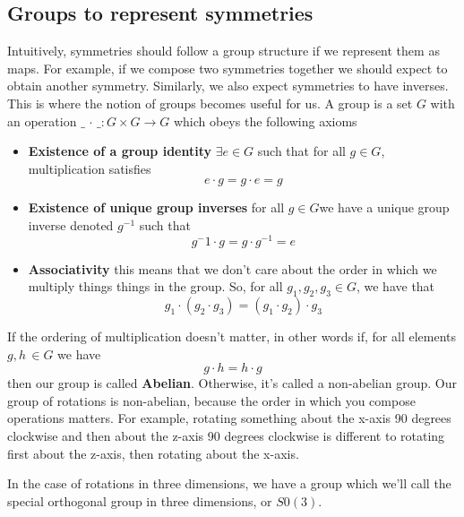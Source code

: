 \subsection{Groups to represent symmetries}
Intuitively, symmetries should follow a group structure if we represent them as maps. For example, if we compose two symmetries together we should expect to obtain another symmetry. Similarly, we also expect symmetries to have inverses. This is where the notion of groups becomes useful for us. A group is a set $G$ with an operation $\_ \,  \cdot \,  \_ : G \times G  \rightarrow G $ which obeys the following axioms

\begin{itemize} 
	\item \textbf{Existence of a group identity }  $ \exists e \in G $ such that for all $g \in G$, multiplication satisfies 
	\[ e \cdot g = g \cdot e = g \] 
	\item \textbf{Existence of unique group inverses } for all $g \in G$we have a unique group inverse denoted $g^{ -1}$ such that 
\[ g^-1 \cdot g = g \cdot g^{ -1}  = e \] 
	\item \textbf{Associativity } this means that we don't care about the order in which we multiply things things in the group. So, for all $g_1, g_2, g_3 \in G$, we have that 
\[ 
	g_1 \cdot (g_2 \cdot g_3)  = (g_1 \cdot g_2 ) \cdot g_3 
\] 
\end{itemize} 
If the ordering of multiplication doesn't matter, in other words if, for all elements $g, h \, \in G$ we have 
\[ 
	g \cdot h  = h \cdot g 
\] 
then our group is called \textbf{Abelian}. Otherwise, it's called a non-abelian group. Our group of rotations is non-abelian, because the order in which you compose operations matters. For example, rotating something about the x-axis 90 degrees clockwise and then about the z-axis 90 degrees clockwise is different to rotating first about the z-axis, then rotating about the x-axis. 

In the case of rotations in three dimensions, we have a group which we'll call the special orthogonal group in three dimensions, or $S0(3) $. 
